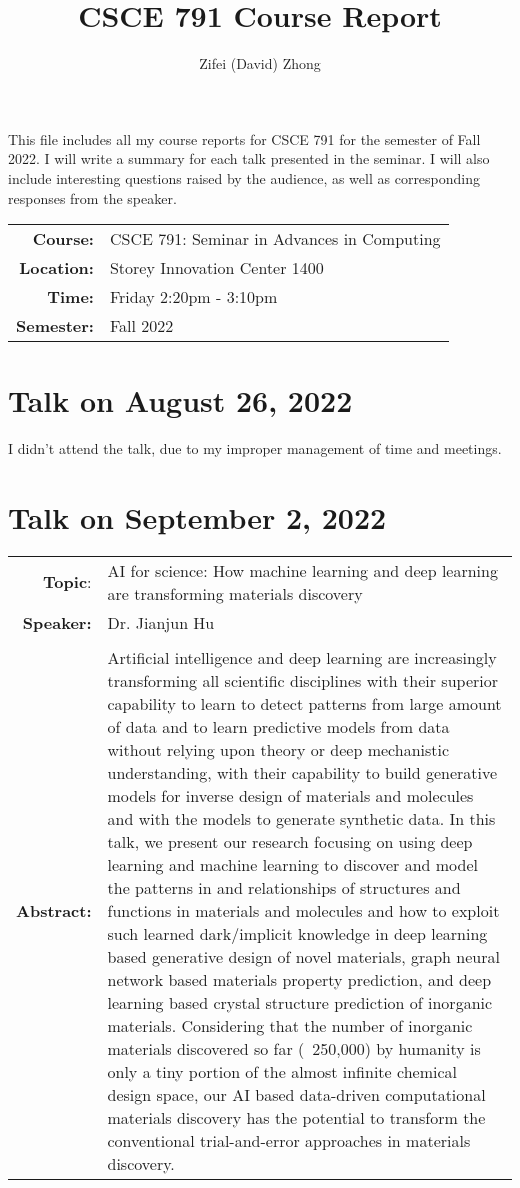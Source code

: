 \documentclass[11pt, oneside]{article}   	%
\title{CSCE 791 Course Report}
\author{Zifei (David) Zhong}
\begin{document}
\maketitle

This file includes all my course reports for CSCE 791 for the semester of Fall 2022. I will write a summary for each talk presented in the seminar. I will also include interesting questions raised by the audience, as well as corresponding responses from the speaker.\\

\begin{center}
\begin{tabularx}{0.65\textwidth}{r X}
\textbf{Course:} & CSCE 791: Seminar in Advances in Computing\\
\textbf{Location:} & Storey Innovation Center 1400\\
\textbf{Time:} & Friday 2:20pm - 3:10pm\\
\textbf{Semester:} & Fall 2022
\end{tabularx}
\end{center}

\newpage
\section{Talk on August 26, 2022}
I didn't attend the talk, due to my improper management of time and meetings.

\newpage
\section{Talk on September 2, 2022}
\begin{tabularx} {\textwidth}{r X}
\textbf{Topic}: & AI for science:  How machine learning and deep learning are transforming materials discovery \\
\textbf{Speaker:} & Dr. Jianjun Hu \\\\
\textbf{Abstract:} & Artificial intelligence and deep learning are increasingly transforming all scientific disciplines with their superior capability to learn to detect patterns from large amount of data and to learn predictive models from  data without relying upon theory or deep mechanistic understanding, with their capability to build generative models for inverse design of materials and molecules and with the models to generate synthetic data. In this talk, we present our research focusing on using deep learning and machine learning to discover and model the patterns in and relationships of structures and functions in materials and molecules and how to exploit such learned dark/implicit knowledge in deep learning based generative design of novel materials, graph neural network based materials property prediction, and deep learning based crystal structure prediction of inorganic materials. Considering that the number of inorganic materials discovered so far (~250,000) by humanity is only a tiny portion of the almost infinite chemical design space, our AI based data-driven computational materials discovery has the potential to transform the conventional trial-and-error approaches in materials discovery. \\
\end{tabularx}
\end{document}
